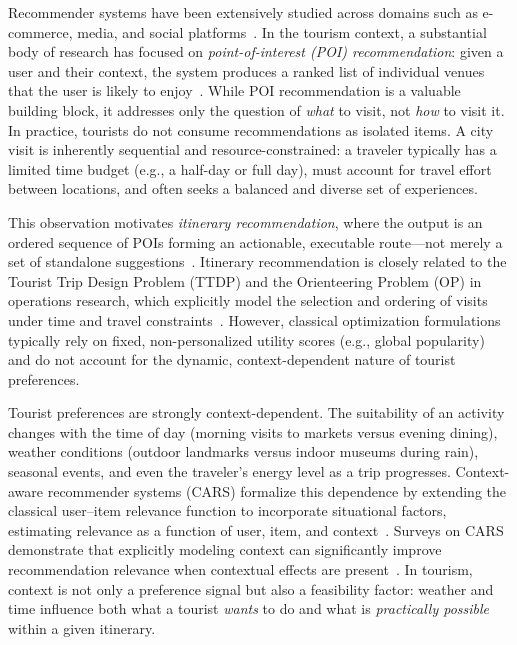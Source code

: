 
Recommender systems have been extensively studied across domains such as e-commerce, media, and social platforms~\cite{koren2009mf}. In the tourism context, a substantial body of research has focused on \emph{point-of-interest (POI) recommendation}: given a user and their context, the system produces a ranked list of individual venues that the user is likely to enjoy~\cite{werneck2021poi, islam2022deep}. While POI recommendation is a valuable building block, it addresses only the question of \emph{what} to visit, not \emph{how} to visit it. In practice, tourists do not consume recommendations as isolated items. A city visit is inherently sequential and resource-constrained: a traveler typically has a limited time budget (e.g., a half-day or full day), must account for travel effort between locations, and often seeks a balanced and diverse set of experiences.

This observation motivates \emph{itinerary recommendation}, where the output is an ordered sequence of POIs forming an actionable, executable route---not merely a set of standalone suggestions~\cite{gavalas2014ttdp, halder2022thesis}. Itinerary recommendation is closely related to the Tourist Trip Design Problem (TTDP) and the Orienteering Problem (OP) in operations research, which explicitly model the selection and ordering of visits under time and travel constraints~\cite{vansteenwegen2011op}. However, classical optimization formulations typically rely on fixed, non-personalized utility scores (e.g., global popularity) and do not account for the dynamic, context-dependent nature of tourist preferences.


Tourist preferences are strongly context-dependent. The suitability of an activity changes with the time of day (morning visits to markets versus evening dining), weather conditions (outdoor landmarks versus indoor museums during rain), seasonal events, and even the traveler's energy level as a trip progresses. Context-aware recommender systems (CARS) formalize this dependence by extending the classical user--item relevance function to incorporate situational factors, estimating relevance as a function of user, item, and context~\cite{adomavicius2005cars, adomavicius2022cars, villegas2018cars}. Surveys on CARS demonstrate that explicitly modeling context can significantly improve recommendation relevance when contextual effects are present~\cite{raza2019cars}. In tourism, context is not only a preference signal but also a feasibility factor: weather and time influence both what a tourist \emph{wants} to do and what is \emph{practically possible} within a given itinerary.

